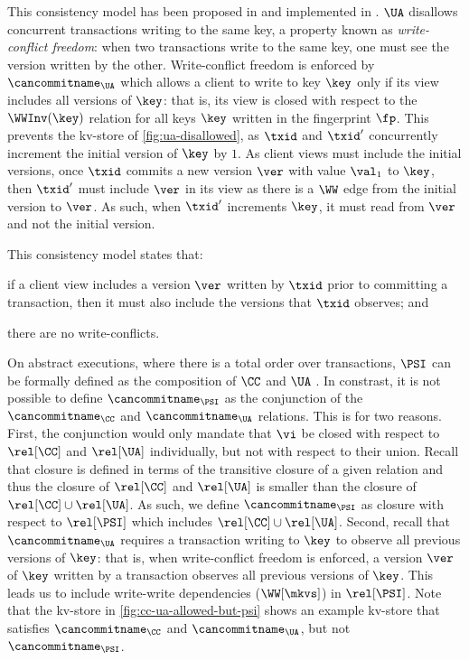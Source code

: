This consistency model has been proposed in \citet{framework-concur} 
and implemented in \citet{rola}.
\(\UA\) disallows concurrent transactions writing to the same key,
a property known as \emph{write-conflict freedom}:  
when two transactions write to the same key, one must see the version 
written by the other.
Write-conflict freedom is enforced by \(\cancommitname_{\UA}\) which
allows a client to write to key \(\key\) only if its view includes all
versions of \(\key\): that is,  its view is closed with respect to the \(\WWInv(\key)\) relation for all keys \(\key\) written in the fingerprint \(\fp\).
This prevents the kv-store of \cref{fig:ua-disallowed},
as \(\txid\) and \(\txid'\) concurrently increment the initial version of \(\key\) by \(1\).
As client views must include the initial versions, once \(\txid\) commits a new version \(\ver\) with value \(\val_1\) to \(\key\), then \(\txid'\) must include \(\ver\) in its view as there is a \(\WW\) edge from the initial version to \(\ver\). 
As such, when \(\txid'\) increments \(\key\), it must read from \(\ver\) and not the initial version.%

This consistency model states that: 
\begin{enumerate*}
	\item if a client view includes a version \(\ver\) written by \( \txid \) prior to committing a transaction, 
then it must also include the versions that \(\txid\) observes; and
	\item there are no write-conflicts.
\end{enumerate*}

On abstract executions, where there is a total order over transactions,  
\(\PSI\) can be formally defined as the composition of
 \(\CC\) and \(\UA\) \cite{framework-concur}. In constrast, it is not possible to define \(\cancommitname_{\PSI}\) as
the conjunction of the \(\cancommitname_{\CC}\) and
\(\cancommitname_{\UA}\) relations. 
This is for two reasons. 
First, the conjunction would only mandate that \(\vi\) be closed with respect to 
\(\rel[\CC]\) and \(\rel[\UA]\) {individually}, but {not} with respect to their {union}.
Recall that closure is defined in terms of the transitive closure of a given relation 
and thus the closure of \(\rel[\CC]\) and \(\rel[\UA]\) is smaller than the closure of \(\rel[\CC] \cup \rel[\UA]\).
As such, we define \(\cancommitname_{\PSI}\) as closure with respect to \(\rel[\PSI] \) which includes \( \rel[\CC] \cup \rel[\UA]\).
Second, recall that \(\cancommitname_{\UA}\) requires a transaction writing 
to \(\key\) to observe all previous versions of \(\key\):
that is, when write-conflict freedom is enforced, a version \(\ver\) of \( \key \)
written by a transaction observes all previous versions of \(\key\). 
This leads us to include write-write dependencies (\(\WW[\mkvs]\)) in \(\rel[\PSI]\). 
Note that the kv-store in \cref{fig:cc-ua-allowed-but-psi} shows an
example kv-store that satisfies \(\cancommitname_{\CC} \) and \( \cancommitname_{\UA}\), 
but not \(\cancommitname_{\PSI}\). 



